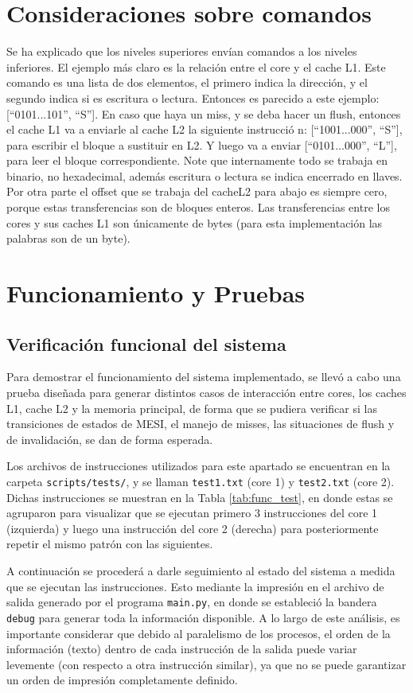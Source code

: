 \documentclass {article}
\begin{document}
\section{Consideraciones sobre comandos}
Se ha explicado que los niveles superiores envían comandos a los niveles inferiores. El ejemplo más
claro es la relación entre el core y el cache L1. Este comando es una lista de dos elementos, el
primero indica la dirección, y el segundo indica si es escritura o lectura. Entonces es parecido a
este ejemplo: [``0101...101'', ``{S}'']. En caso que haya un miss, y se deba hacer un flush, entonces el
cache L1 va a enviarle al cache L2 la siguiente instrucci\'o n: [``1001...000'', ``{S}''], para escribir
el bloque a sustituir en L2. Y luego va a enviar [``0101...000'', ``{L}''], para leer el bloque
correspondiente. Note que internamente todo se trabaja en binario, no hexadecimal, además escritura
o lectura se indica encerrado en llaves. Por otra parte el offset que se trabaja del cacheL2 para
abajo es siempre cero, porque estas transferencias son de bloques enteros. Las transferencias entre
los cores y sus caches L1 son únicamente de bytes (para esta implementación las palabras son de un byte). 


\section{Funcionamiento y Pruebas}
\subsection{Verificación funcional del sistema}
Para demostrar el funcionamiento del sistema implementado, se llevó a cabo una prueba diseñada para
generar distintos casos de interacción entre cores, los caches L1, cache L2 y la memoria principal,
de forma que se pudiera verificar si las transiciones de estados de MESI, el manejo de misses, las
situaciones de flush y de invalidación, se dan de forma esperada. 

Los archivos de instrucciones utilizados para este apartado se encuentran en la carpeta
\texttt{scripts/tests/}, y se llaman \texttt{test1.txt} (core 1) y \texttt{test2.txt} (core
2). Dichas instrucciones se muestran en la Tabla \ref{tab:func_test}, en donde estas se agruparon
para visualizar que se ejecutan primero 3 instrucciones del core 1 (izquierda) y luego una
instrucción del core 2 (derecha) para posteriormente repetir el mismo patrón con las siguientes.

A continuación se procederá a darle seguimiento al estado del sistema a medida que se ejecutan las
instrucciones. Esto mediante la impresión en el archivo de salida generado por el programa
\texttt{main.py}, en donde se estableció la bandera \texttt{debug} para generar toda la información
disponible. A lo largo de este análisis, es importante considerar que debido al paralelismo de los
procesos, el orden de la información (texto) dentro de cada instrucción de la salida puede variar
levemente (con respecto a otra instrucción similar), ya que no se puede garantizar un orden de
impresión completamente definido.
\end{document}

